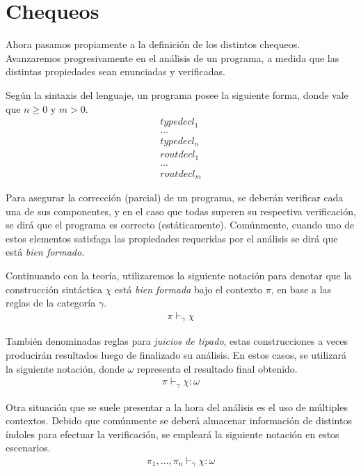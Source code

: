 \documentclass{article}
\begin{document}
\section{Chequeos}

Ahora pasamos propiamente a la definición de los distintos chequeos.
Avanzaremos progresivamente en el análisis de un programa, a medida que las distintas propiedades sean enunciadas y verificadas.

Según la sintaxis del lenguaje, un programa posee la siguiente forma, donde vale que $n \geq 0$ y $m > 0$.
\begin{gather*}
typedecl_1 \\
\ldots \\
typedecl_n \\
routdecl_1 \\
\ldots \\
routdecl_m
\end{gather*}

Para asegurar la corrección (parcial) de un programa, se deberán verificar cada una de sus componentes, y en el caso que todas superen su respectiva verificación, se dirá que el programa es correcto (estáticamente).
Comúnmente, cuando uno de estos elementos satisfaga las propiedades requeridas por el análisis se dirá que está \textit{bien formado}.

Continuando con la teoría, utilizaremos la siguiente notación para denotar que la construcción sintáctica $\chi$ está \textit{bien formada} bajo el contexto $\pi$, en base a las reglas de la categoría $\gamma$.
\begin{gather*}
\pi \vdash_{\gamma} \chi
\end{gather*}

También denominadas reglas para \textit{juicios de tipado}, estas construcciones a veces producirán resultados luego de finalizado su análisis.
En estos casos, se utilizará la siguiente notación, donde $\omega$ representa el resultado final obtenido.
\begin{gather*}
\pi \vdash_{\gamma} \chi : \omega
\end{gather*}

Otra situación que se suele presentar a la hora del análisis es el uso de múltiples contextos.
Debido que comúnmente se deberá almacenar información de distintos índoles para efectuar la verificación, se empleará la siguiente notación en estos escenarios.
\begin{gather*}
\pi_1, \ldots, \pi_n \vdash_{\gamma} \chi : \omega
\end{gather*}
\end{document}
